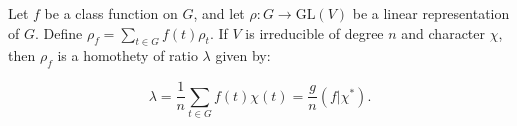 Let $f$ be a class function on $G$, and let $\rho: G \to \text{GL}(V)$ be a linear representation of $G$. Define $\rho_f = \sum_{t \in G} f(t) \rho_t$. If $V$ is irreducible of degree $n$ and character $\chi$, then $\rho_f$ is a homothety of ratio $\lambda$ given by:

$$\lambda = \frac{1}{n} \sum_{t \in G} f(t) \chi(t) = \frac{g}{n} (f|\chi^*).$$
